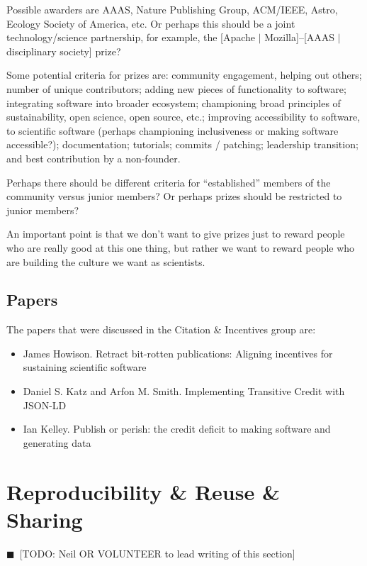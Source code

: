 \documentclass[11pt, oneside]{amsart}
\newcommand{\todo}[1]{{\color{blue}$\blacksquare$~\textsf{[TODO: #1]}}}
\begin{document}
Possible awarders are AAAS, Nature Publishing Group, ACM/IEEE, Astro, Ecology Society of America, etc.  Or perhaps this should be a joint technology/science partnership, for example, the [Apache $|$ Mozilla]--[AAAS $|$ disciplinary society] prize?

Some potential criteria for prizes are:
community engagement, helping out others;
number of unique contributors;
adding new pieces of functionality to software;
integrating software into broader ecosystem; championing broad principles of sustainability, open science, open source, etc.;
improving accessibility to software, to scientific software (perhaps championing inclusiveness or making software accessible?);
documentation;
tutorials;
commits / patching;
leadership transition; and
best contribution by a non-founder.

Perhaps there should be different criteria for ``established'' members of the community versus junior members?  Or perhaps prizes should be restricted to junior members?

An important point is that we don't want to give prizes just to reward people who are really good at this one thing, but rather we want to reward people who are building the culture we want as scientists.

 



\subsection{Papers}
The papers that were discussed in the Citation \& Incentives group are:
\begin{itemize}
\item James Howison. Retract bit-rotten publications: Aligning incentives for
sustaining scientific software~\cite{wssspe2_howison}

\item Daniel S. Katz and Arfon M. Smith. Implementing Transitive Credit with
{JSON-LD}~\cite{wssspe2_katz}

\item Ian Kelley. Publish or perish: the credit deficit to making software and
generating data~\cite{wssspe2_kelley}
\end{itemize}

\section{Reproducibility \& Reuse \& Sharing} \label{sec:reproduce}
\todo{Neil OR VOLUNTEER to lead writing of this section}
\end{document}
